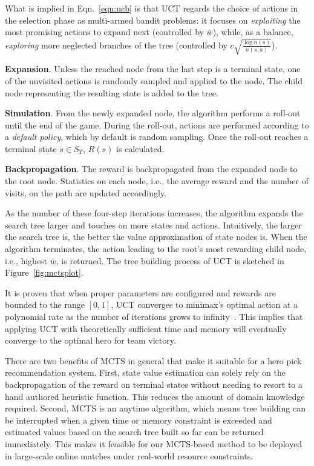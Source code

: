 What is implied in Eqn.~\ref{eqn:ucb} is that UCT regards the choice of actions in the selection phase as multi-armed bandit problems: it focuses on \textit{exploiting} the most promising actions to expand next (controlled by $\bar{w}$), while, as a balance,  \textit{exploring} more neglected branches of the tree (controlled by $c \sqrt{\frac{\log n(s)}{n(s, a)}}$). 
    
\textbf{Expansion}. Unless the reached node from the last step is a terminal state, one of the unvisited actions is randomly sampled and applied to the node. The child node representing the resulting state is added to the tree.

\textbf{Simulation}. From the newly expanded node, the algorithm performs a roll-out until the end of the game. During the roll-out, actions are performed according to a \textit{default policy}, which by default is random sampling. Once the roll-out reaches a terminal state $s \in S_T$, $R(s)$ is calculated.

\textbf{Backpropagation}. The reward is backpropagated from the expanded node to the root node. Statistics on each node, i.e., the average reward and the number of visits, on the path are updated accordingly.

As the number of these four-step iterations increases, the algorithm expands the search tree larger and touches on more states and actions. Intuitively, the larger the search tree is, the better the value approximation of state nodes is. When the algorithm terminates, the action leading to the root's most rewarding child node, i.e., highest $\bar{w}$, is returned. The tree building process of UCT is sketched in Figure~\ref{fig:mctsplot}.

It is proven that when proper parameters are configured and rewards are bounded to the range $[0,1]$, UCT converges to minimax's optimal action at a polynomial rate as the number of iterations grows to infinity~\cite{kocsis2006bandit}. This implies that applying UCT with theoretically sufficient time and memory will eventually converge to the optimal hero for team victory. 

There are two benefits of MCTS in general that make it suitable for a hero pick recommendation system. First, state value estimation can solely rely on the backpropagation of the reward on terminal states without needing to resort to a hand authored heuristic function. This reduces the amount of domain knowledge required. Second, MCTS is an anytime algorithm, which means tree building can be interrupted when a given time or memory constraint is exceeded and estimated values based on the search tree built so far can be returned immediately. This makes it feasible for our MCTS-based method to be deployed in large-scale online matches under real-world resource constraints.

